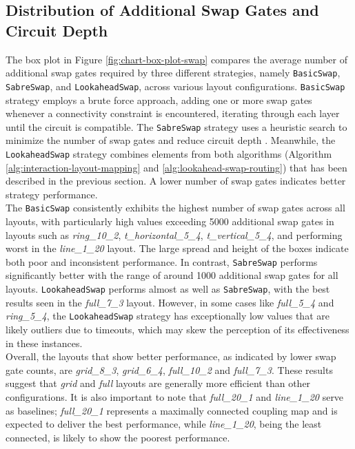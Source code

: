 \subsection{Distribution of Additional Swap Gates and Circuit Depth} %
The box plot in Figure \ref{fig:chart-box-plot-swap} compares the average number of additional swap gates required by three different strategies, namely \lstinline{BasicSwap}, \lstinline{SabreSwap}, and \lstinline{LookaheadSwap}, across various layout configurations. \lstinline{BasicSwap} \cite{ibmquantum_basicswap} strategy employs a brute force approach, adding one or more swap gates whenever a connectivity constraint is encountered, iterating through each layer until the circuit is compatible. The \lstinline{SabreSwap} strategy uses a heuristic search to minimize the number of swap gates and reduce circuit depth \cite{li_tackling_2019, ibmquantum_sabreswap}. Meanwhile, the \lstinline{LookaheadSwap} strategy combines elements from both algorithms (Algorithm \ref{alg:interaction-layout-mapping} and \ref{alg:lookahead-swap-routing}) that has been described in the previous section. A lower number of swap gates indicates better strategy performance. \\
The \lstinline{BasicSwap} consistently exhibits the highest number of swap gates across all layouts, with particularly high values exceeding 5000 additional swap gates in layouts such as \textit{ring\_10\_2}, \textit{t\_horizontal\_5\_4}, \textit{t\_vertical\_5\_4}, and performing worst in the \textit{line\_1\_20} layout. The large spread and height of the boxes indicate both poor and inconsistent performance. In contrast, \lstinline{SabreSwap} performs significantly better with the range of around 1000 additional swap gates for all layouts. \lstinline{LookaheadSwap} performs almost as well as \lstinline{SabreSwap}, with the best results seen in the \textit{full\_7\_3} layout. However, in some cases like \textit{full\_5\_4} and \textit{ring\_5\_4}, the \lstinline{LookaheadSwap} strategy has exceptionally low values that are likely outliers due to timeouts, which may skew the perception of its effectiveness in these instances. \\
Overall, the layouts that show better performance, as indicated by lower swap gate counts, are \textit{grid\_8\_3}, \textit{grid\_6\_4}, \textit{full\_10\_2} and \textit{full\_7\_3}. These results suggest that \textit{grid} and \textit{full} layouts are generally more efficient than other configurations. It is also important to note that \textit{full\_20\_1} and \textit{line\_1\_20} serve as baselines; \textit{full\_20\_1} represents a maximally connected coupling map and is expected to deliver the best performance, while \textit{line\_1\_20}, being the least connected, is likely to show the poorest performance. \\
